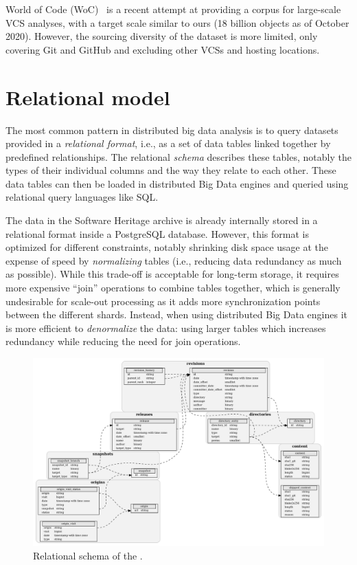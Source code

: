 World of Code (WoC)~\cite{mockus2019woc} is a recent attempt at providing a
corpus for large-scale VCS analyses, with a target scale similar to ours (18
billion objects as of October 2020). However, the sourcing diversity of the
dataset is more limited, only covering Git and GitHub and excluding other
\glspl{VCS} and hosting locations.

\section{Relational model}%
\label{sec:relational-model}

The most common pattern in distributed big data analysis is to query datasets
provided in a \emph{relational format}, i.e., as a set of data tables linked
together by predefined relationships. The relational \emph{schema} describes
these tables, notably the types of their individual columns and the way they
relate to each other. These data tables can then be loaded in distributed Big
Data engines and queried using relational query languages like SQL\@.

The data in the Software Heritage archive is already internally stored in a
relational format inside a PostgreSQL database. However, this format is
optimized for different constraints, notably shrinking disk space usage at the
expense of speed by \emph{normalizing} tables (i.e., reducing data redundancy
as much as possible). While this trade-off is acceptable for long-term storage,
it requires more expensive ``join'' operations to combine tables together,
which is generally undesirable for scale-out processing as it adds more
synchronization points between the different shards. Instead, when using
distributed Big Data engines it is more efficient to \emph{denormalize} the
data: using larger tables which increases redundancy while reducing the need
for join operations.

\begin{figure}
    \includegraphics[width=\linewidth]{img/graph-dataset/db-schema}
    \caption{Relational schema of the \SWHGD{}.}%
    \label{fig:swh-dataset-schema}
\end{figure}

